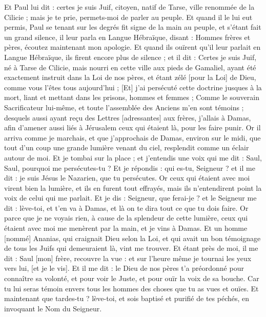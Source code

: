 \begin{multicols}{2}
Et Paul lui dit : certes je suis Juif, citoyen, natif de Tarse, ville renommée de la Cilicie ; mais je te prie, permets-moi de parler au peuple.
Et quand il le lui eut permis, Paul se tenant sur les degrés fit signe de la main au peuple, et s'étant fait un grand silence, il leur parla en Langue Hébraïque, disant :
\VerseOne{}Hommes frères et pères, écoutez maintenant mon apologie.
Et quand ils ouïrent qu'il leur parlait en Langue Hébraïque, ils firent encore plus de silence ; et il dit :
Certes je suis Juif, né à Tarse de Cilicie, mais nourri en cette ville aux pieds de Gamaliel, ayant été exactement instruit dans la Loi de nos pères, et étant zélé [pour la Loi] de Dieu, comme vous l'êtes tous aujourd'hui ;
[Et] j'ai persécuté cette doctrine jusques à la mort, liant et mettant dans les prisons, hommes et femmes ;
Comme le souverain Sacrificateur lui-même, et toute l'assemblée des Anciens m'en sont témoins ; desquels aussi ayant reçu des Lettres [adressantes] aux frères, j'allais à Damas, afin d'amener aussi liés à Jérusalem ceux qui étaient là, pour les faire punir.
Or il arriva comme je marchais, et que j'approchais de Damas, environ sur le midi, que tout d'un coup une grande lumière venant du ciel, resplendit comme un éclair autour de moi.
Et je tombai sur la place ; et j'entendis une voix qui me dit : Saul, Saul, pourquoi me persécutes-tu ?
Et je répondis : qui es-tu, Seigneur ? et il me dit : je suis Jésus le Nazarien, que tu persécutes.
Or ceux qui étaient avec moi virent bien la lumière, et ils en furent tout effrayés, mais ils n'entendirent point la voix de celui qui me parlait.
Et je dis : Seigneur, que ferai-je ? et le Seigneur me dit : lève-toi, et t'en va à Damas, et là on te dira tout ce que tu dois faire.
Or parce que je ne voyais rien, à cause de la splendeur de cette lumière, ceux qui étaient avec moi me menèrent par la main, et je vins à Damas.
Et un homme [nommé] Ananias, qui craignait Dieu selon la Loi, et qui avait un bon témoignage de tous les Juifs qui demeuraient là, vint me trouver.
Et étant près de moi, il me dit : Saul [mon] frère, recouvre la vue : et sur l'heure même je tournai les yeux vers lui, [et je le vis].
Et il me dit : le Dieu de nos pères t'a préordonné pour connaître sa volonté, et pour voir le Juste, et pour ouïr la voix de sa bouche.
Car tu lui seras témoin envers tous les hommes des choses que tu as vues et ouïes.
Et maintenant que tardes-tu ? lève-toi, et sois baptisé et purifié de tes péchés, en invoquant le Nom du Seigneur.

\end{multicols}
